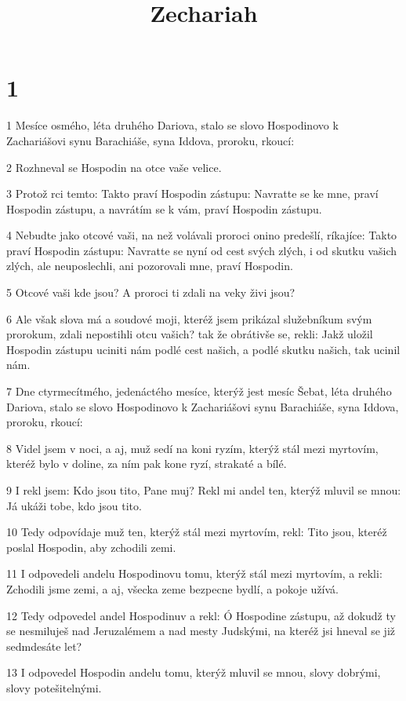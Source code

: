 

\title{Zechariah}

\chapter{1}

\par 1 Mesíce osmého, léta druhého Dariova, stalo se slovo Hospodinovo k Zachariášovi synu Barachiáše, syna Iddova, proroku, rkoucí:
\par 2 Rozhneval se Hospodin na otce vaše velice.
\par 3 Protož rci temto: Takto praví Hospodin zástupu: Navratte se ke mne, praví Hospodin zástupu, a navrátím se k vám, praví Hospodin zástupu.
\par 4 Nebudte jako otcové vaši, na než volávali proroci onino predešlí, ríkajíce: Takto praví Hospodin zástupu: Navratte se nyní od cest svých zlých, i od skutku vašich zlých, ale neuposlechli, ani pozorovali mne, praví Hospodin.
\par 5 Otcové vaši kde jsou? A proroci ti zdali na veky živi jsou?
\par 6 Ale však slova má a soudové moji, kteréž jsem prikázal služebníkum svým prorokum, zdali nepostihli otcu vašich? tak že obrátivše se, rekli: Jakž uložil Hospodin zástupu uciniti nám podlé cest našich, a podlé skutku našich, tak ucinil nám.
\par 7 Dne ctyrmecítmého, jedenáctého mesíce, kterýž jest mesíc Šebat, léta druhého Dariova, stalo se slovo Hospodinovo k Zachariášovi synu Barachiáše, syna Iddova, proroku, rkoucí:
\par 8 Videl jsem v noci, a aj, muž sedí na koni ryzím, kterýž stál mezi myrtovím, kteréž bylo v doline, za ním pak kone ryzí, strakaté a bílé.
\par 9 I rekl jsem: Kdo jsou tito, Pane muj? Rekl mi andel ten, kterýž mluvil se mnou: Já ukáži tobe, kdo jsou tito.
\par 10 Tedy odpovídaje muž ten, kterýž stál mezi myrtovím, rekl: Tito jsou, kteréž poslal Hospodin, aby zchodili zemi.
\par 11 I odpovedeli andelu Hospodinovu tomu, kterýž stál mezi myrtovím, a rekli: Zchodili jsme zemi, a aj, všecka zeme bezpecne bydlí, a pokoje užívá.
\par 12 Tedy odpovedel andel Hospodinuv a rekl: Ó Hospodine zástupu, až dokudž ty se nesmiluješ nad Jeruzalémem a nad mesty Judskými, na kteréž jsi hneval se již sedmdesáte let?
\par 13 I odpovedel Hospodin andelu tomu, kterýž mluvil se mnou, slovy dobrými, slovy potešitelnými.
